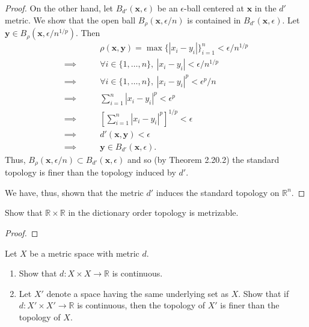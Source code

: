\documentclass[a4paper,10pt]{article}
\newcommand{\bx}{\mathbf{x}}
\newcommand{\by}{\mathbf{y}}
\newcommand{\RR}{\mathbb{R}}
\begin{document}
\begin{solution}
\begin{proof}
        On the other hand, let $B_{d'}(\bx, \epsilon)$ be an $\epsilon$-ball centered at $\bx$ in the $d'$ metric.
        We show that the open ball $B_\rho(\bx, \epsilon/n)$ is contained in $B_{d'}(\bx, \epsilon)$.
        Let $\by \in B_\rho(\bx, \epsilon/n^{1/p})$.
        Then
        \begin{align*}
                            & \rho(\bx, \by)  = \max\{|x_i - y_i|\}_{i=1}^n < \epsilon / n^{1/p} \\
            \implies\qquad  & \forall i \in \{1, \ldots, n\},~ |x_i - y_i| < \epsilon / n^{1/p} \\
            \implies\qquad  & \forall i \in \{1, \ldots, n\},~ |x_i - y_i|^p < \epsilon^p / n \\
            \implies\qquad  & \sum_{i=1}^n |x_i - y_i|^p < \epsilon^p \\
            \implies\qquad  & \left[\sum_{i=1}^n |x_i - y_i|^p\right]^{1/p} < \epsilon \\
            \implies\qquad  & d'(\bx, \by) < \epsilon \\
            \implies\qquad  & \by \in B_{d'}(\bx, \epsilon).
        \end{align*}
        Thus, $B_\rho(\bx, \epsilon / n) \subset B_{d'}(\bx, \epsilon)$ and so (by Theorem 2.20.2) the standard topology is finer than the topology induced by $d'$.

        We have, thus, shown that the metric $d'$ induces the standard topology on $\RR^n$.
    \end{proof}
\end{solution}
\newpage

\begin{exercise}[ID=2.20.2]
    Show that $\RR \times \RR$ in the dictionary order topology is metrizable.
\end{exercise}

\begin{solution}
    \begin{proof}
    \end{proof}
\end{solution}
\newpage

\begin{exercise}[ID=2.20.3]
    Let $X$ be a metric space with metric $d$.
    \begin{enumerate}[label={(\alph*)}, align=left, leftmargin=\parindent, listparindent=\parindent, labelwidth=0pt, itemindent=!]
        \item Show that $d: X \times X \rightarrow \RR$ is continuous.
        \item Let $X'$ denote a space having the same underlying set as $X$.
        Show that if $d: X' \times X' \rightarrow \RR$ is continuous, then the topology of $X'$ is finer than the topology of $X$.
    \end{enumerate}
\end{exercise}
\end{document}

